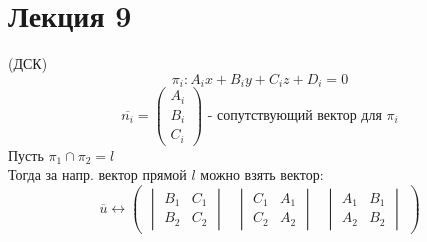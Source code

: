 \section{Лекция 9}
\begin{statement}(ДСК)
  \[
  \pi_i \colon A_i x + B_i y + C_i z + D_i = 0
  \]
  \[
  \overline{n_i} = \begin{pmatrix}A_i \\ B_i \\ C_i \end{pmatrix} \text{ - сопутствующий вектор для $\pi_i$}
  \]
  Пусть $\pi_1 \cap \pi_2 = l$ \\

  Тогда за напр. вектор прямой $l$ можно взять вектор:
  \[
    \overline{u} \underset{}{\longleftrightarrow} \begin{pmatrix} \begin{vmatrix}B_1 & C_1 \\ B_2 & C_2 \end{vmatrix} & \begin{vmatrix}C_1 & A_1 \\ C_2 & A_2 \end{vmatrix} & \begin{vmatrix}A_1 & B_1 \\ A_2 & B_2 \end{vmatrix} \end{pmatrix}
  \]
\end{statement}
